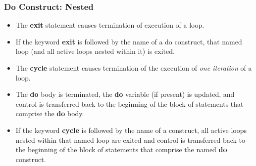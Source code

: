 \documentclass[slidestop,mathserif,compress,xcolor=svgnames]{beamer}
\newenvironment{eblock}[0]
{
\begin{beamerboxesrounded}[upper=uppercol2,lower=lowercol2,shadow=true]}
{\end{beamerboxesrounded}}
\begin{document}
\begin{frame}[fragile]
  \frametitle{\small Do Construct: Nested}
  \begin{itemize}
    \item The \textbf{exit} statement causes termination of execution of a loop. 
    \item If the keyword \textbf{exit} is followed by the name of a do construct, that named loop (and all active loops nested within it) is exited.
    \item The \textbf{cycle } statement causes termination of the execution of \textit{one iteration} of a loop.
    \item The \textbf{do} body is terminated, the \textbf{do} variable (if present) is updated, and control is transferred back to the beginning of the block of statements that comprise the \textbf{do} body. 
    \item If the keyword \textbf{cycle} is followed by the name of a construct, all active loops nested within that named loop are exited and control is transferred back to the beginning of the block of statements that comprise the named \textbf{do} construct.
  \end{itemize}
\end{frame}
\end{document}
